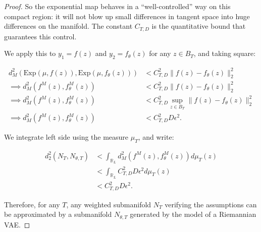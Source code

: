 \documentclass{article}
\begin{document}
\begin{proof}
So the exponential map behaves in a ``well-controlled'' way on this compact region: 
it will not blow up small differences in tangent space into huge differences on the 
manifold. The constant $C_{T,D}$ is the quantitative bound that guarantees this control.

We apply this to $y_1 = f(z)$ and $y_2 = f_\theta(z)$ for any $z \in B_T$, and taking square:

\[
\begin{aligned}
d_M^2(\mathrm{Exp}(\mu,f(z)), \mathrm{Exp}(\mu,f_\theta(z))) &< C^2_{T,D}\|f(z)- f_\theta(z)\|^2_2\\[6pt]
\implies d_M^2(f^M(z), f^M_{\theta}(z)) &< C^2_{T,D}\|f(z)- f_\theta(z)\|^2_2\\[6pt]
\implies d_M^2(f^M(z), f^M_{\theta}(z)) &< C^2_{T,D}\sup_{z \in B_T} \| f(z) - f_\theta(z) \|_2^2\\[6pt]
\implies d_M^2(f^M(z), f^M_{\theta}(z)) &< C^2_{T,D}D\epsilon^2.
\end{aligned}
\]

We integrate left side using the measure $\mu_T$, and write:

\[
\begin{aligned}
d_2^2(N_T,N_{\theta,T}) &< \int_{\mathbb{R}_L} d_M^2(f^M(z), f^M_{\theta}(z))d\mu_T(z)\\[6pt]
&< \int_{\mathbb{R}_L} C^2_{T,D}D\epsilon^2 d\mu_T(z)\\[6pt]
&< C^2_{T,D}D\epsilon^2.
\end{aligned}
\]

Therefore, for any $T$, any weighted submanifold $N_T$ verifying the assumptions can be approximated by a submanifold
$N_{\theta,T}$ generated by the model of a Riemannian VAE.

\end{proof}


\end{document}
